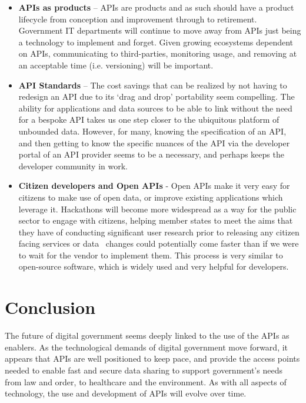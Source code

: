 \begin{itemize}
	\item \textbf{APIs as products} – APIs are products and as such should have a
	product lifecycle from conception and improvement through to retirement.
	Government IT departments will continue to move away from APIs just being
	a technology to implement and forget. Given growing ecosystems dependent
	on APIs, communicating to third-parties, monitoring usage, and removing at
	an acceptable time (i.e. versioning) will be important.
	
	\item \textbf{API Standards} – The cost savings that can be realized by not having
	to redesign an API due to its ‘drag and drop’ portability seem compelling.
	The ability for applications and data sources to be able to link without
	the need for a bespoke API takes us one step closer to the ubiquitous platform
	of unbounded data. However, for many, knowing the specification of an API,
	and then getting to know the specific nuances of the API via the developer
	portal of an API provider seems to be a	necessary, and perhaps keeps the
	developer community in work.
	
	\item \textbf{Citizen developers and Open APIs} - Open APIs make it very easy for
	citizens to make use of	open data, or improve existing applications which
	leverage it. Hackathons will become more widespread as a way for the public
	sector to engage with citizens, helping member states to meet the aims that
	they have of conducting significant user research prior to releasing any
	citizen facing services or data~\citep{digital_first} changes could potentially come
	faster than if we were to wait for the vendor to implement them. This process
	is very similar to open-source software, which is widely used and very
	helpful for developers.
\end{itemize}

\section{Conclusion}

The future of digital government seems deeply linked to the use of the APIs as
enablers. As the technological demands of digital government move forward, it
appears that APIs are well positioned to keep pace, and provide the access points
needed to enable fast and secure data sharing to support government’s needs from
law and order, to healthcare and the environment. As with all aspects of technology,
the use and development of APIs will evolve over time.